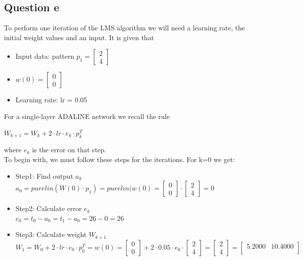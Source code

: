 \subsection{Question e}
\label{Questione}
To perform one iteration of the LMS algorithm we will need a learning rate, the initial weight values and an input. It is given that
\begin{itemize}
	\item Input data: pattern $p_1 = \left[
	\begin{array}{c}
		2 \\
		4
	\end{array}
	\right]
	$
	\item $w(0) = \left[
	\begin{array}{c}
		0 \\
		0
	\end{array}
	\right]
	$
	\item Learning rate: lr = 0.05
\end{itemize}
For a single-layer ADALINE network we recall the rule
\begin{center}
	$W_{k+1} = W_k + 2 \cdot lr \cdot e_k \cdot p_k^T$
\end{center}
where $e_k$ is the error on that step.\\

To begin with, we must follow these steps for the iterations. For k=0 we get:
\begin{itemize}
	\item Step1: Find output $a_k$\\
	$a_0 = purelin(W(0) \cdot p_1) = purelin(w(0) = \left[
	\begin{array}{c}
		0 \\
		0
	\end{array}
	\right] \cdot \left[\begin{array}{c}
		2 \\
		4
	\end{array}
	\right] = 0 $
	\item Step2: Calculate error $e_k$\\
	$e_0 = t_0 - a_0 = t_1 - a_0 = 26 - 0 = 26$
	\item Step3: Calculate weight $W_{k+1}$\\
	$W_{1} = W_0 + 2 \cdot lr \cdot e_0 \cdot p_0^T = w(0) = \left[
	\begin{array}{c}
		0 \\
		0
	\end{array}
	\right] + 2 \cdot 0.05 \cdot e_0 \cdot  \left[
	\begin{array}{c}
		2 \\
		4
	\end{array}
	\right] =  \left[
	\begin{array}{c}
		2 \\
		4
	\end{array}
	\right] =  \left[
	\begin{array}{cc}
		5.2000 & 10.4000 \\
	\end{array}
	\right]$
	
\end{itemize}







	

